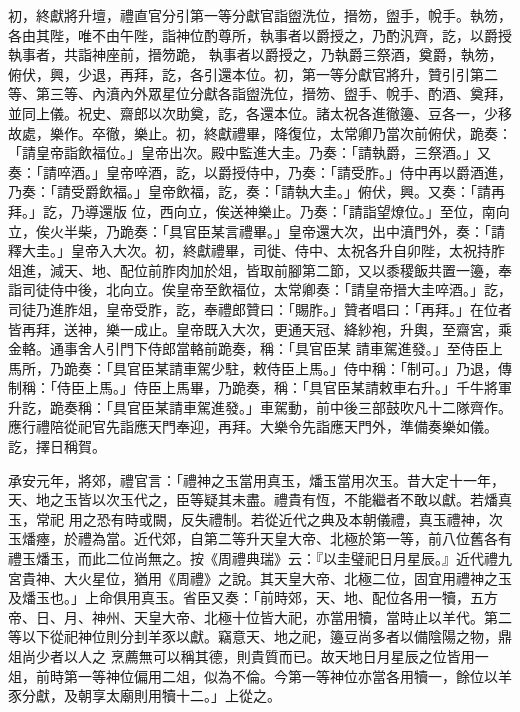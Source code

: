 \begin{pinyinscope}
 初，終獻將升壇，禮直官分引第一等分獻官詣盥洗位，搢笏，盥手，帨手。執笏，各由其陛，唯不由午陛，詣神位酌尊所，執事者以爵授之，乃酌汎齊，訖，以爵授執事者，共詣神座前，搢笏跪，
 執事者以爵授之，乃執爵三祭酒，奠爵，執笏，俯伏，興，少退，再拜，訖，各引還本位。初，第一等分獻官將升，贊引引第二等、第三等、內濆內外眾星位分獻各詣盥洗位，搢笏、盥手、帨手、酌酒、奠拜，並同上儀。祝史、齋郎以次助奠，訖，各還本位。諸太祝各進徹籩、豆各一，少移故處，樂作。卒徹，樂止。初，終獻禮畢，降復位，太常卿乃當次前俯伏，跪奏：「請皇帝詣飲福位。」皇帝出次。殿中監進大圭。乃奏：「請執爵，三祭酒。」又奏：「請啐酒。」皇帝啐酒，訖，以爵授侍中，乃奏：「請受胙。」侍中再以爵酒進，乃奏：「請受爵飲福。」皇帝飲福，訖，奏：「請執大圭。」俯伏，興。又奏：「請再拜。」訖，乃導還版
 位，西向立，俟送神樂止。乃奏：「請詣望燎位。」至位，南向立，俟火半柴，乃跪奏：「具官臣某言禮畢。」皇帝還大次，出中濆門外，奏：「請釋大圭。」皇帝入大次。初，終獻禮畢，司徙、侍中、太祝各升自卯陛，太祝持胙俎進，減天、地、配位前胙肉加於俎，皆取前腳第二節，又以黍稷飯共置一籩，奉詣司徒侍中後，北向立。俟皇帝至飲福位，太常卿奏：「請皇帝搢大圭啐酒。」訖，司徒乃進胙俎，皇帝受胙，訖，奉禮郎贊曰：「賜胙。」贊者唱曰：「再拜。」在位者皆再拜，送神，樂一成止。皇帝既入大次，更通天冠、絳紗袍，升輿，至齋宮，乘金輅。通事舍人引門下侍郎當輅前跪奏，稱：「具官臣某
 請車駕進發。」至侍臣上馬所，乃跪奏：「具官臣某請車駕少駐，敕侍臣上馬。」侍中稱：「制可。」乃退，傳制稱：「侍臣上馬。」侍臣上馬畢，乃跪奏，稱：「具官臣某請敕車右升。」千牛將軍升訖，跪奏稱：「具官臣某請車駕進發。」車駕動，前中後三部鼓吹凡十二隊齊作。應行禮陪從祀官先詣應天門奉迎，再拜。大樂令先詣應天門外，準備奏樂如儀。訖，擇日稱賀。



 承安元年，將郊，禮官言：「禮神之玉當用真玉，燔玉當用次玉。昔大定十一年，天、地之玉皆以次玉代之，臣等疑其未盡。禮貴有恆，不能繼者不敢以獻。若燔真玉，常祀
 用之恐有時或闕，反失禮制。若從近代之典及本朝儀禮，真玉禮神，次玉燔瘞，於禮為當。近代郊，自第二等升天皇大帝、北極於第一等，前八位舊各有禮玉燔玉，而此二位尚無之。按《周禮典瑞》云：『以圭璧祀日月星辰。』近代禮九宮貴神、大火星位，猶用《周禮》之說。其天皇大帝、北極二位，固宜用禮神之玉及燔玉也。」上命俱用真玉。省臣又奏：「前時郊，天、地、配位各用一犢，五方帝、日、月、神州、天皇大帝、北極十位皆大祀，亦當用犢，當時止以羊代。第二等以下從祀神位則分刲羊豕以獻。竊意天、地之祀，籩豆尚多者以備陰陽之物，鼎俎尚少者以人之
 烹薦無可以稱其德，則貴質而已。故天地日月星辰之位皆用一俎，前時第一等神位偏用二俎，似為不倫。今第一等神位亦當各用犢一，餘位以羊豕分獻，及朝享太廟則用犢十二。」上從之。



\end{pinyinscope}
